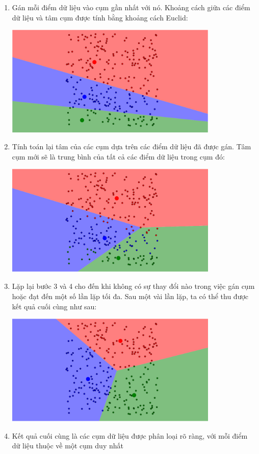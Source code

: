 \begin{enumerate}
	\item Gán mỗi điểm dữ liệu vào cụm gần nhất với nó. Khoảng cách giữa các điểm dữ liệu và tâm cụm được tính bằng khoảng cách Euclid:
	      \begin {center}
	      \includegraphics[width=0.8\textwidth]{images/kmean/3.png}
	      \end{center}
	\item Tính toán lại tâm của các cụm dựa trên các điểm dữ liệu đã được gán. Tâm cụm mới sẽ là trung bình của tất cả các điểm dữ liệu trong cụm đó:
	      \begin{center}
		      \includegraphics[width=0.8\textwidth]{images/kmean/4.png}
	      \end{center}
	\item Lặp lại bước 3 và 4 cho đến khi không có sự thay đổi nào trong việc gán cụm hoặc đạt đến một số lần lặp tối đa. Sau một vài lần lặp, ta có thể thu được kết quả cuối cùng như sau:
	      \begin {center}
	      \includegraphics[width=0.8\textwidth]{images/kmean/5.png}
	      \end{center}
	\item Kết quả cuối cùng là các cụm dữ liệu được phân loại rõ ràng, với mỗi điểm dữ liệu thuộc về một cụm duy nhất

\end{enumerate}

